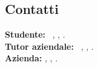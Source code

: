 
\subsection{Contatti}
	\textbf{Studente:} \nomeStudente\ \cognomeStudente, \href{mailto:\emailStudente}{\emailStudente}, \telStudente. \\
	\newline
	\textbf{Tutor aziendale:} \nomeTutorAziendale\ \cognomeTutorAziendale, \href{mailto:\emailTutorAziendale}{\emailTutorAziendale}, \telTutorAziendale. \\
	\newline
	\textbf{Azienda:} \ragioneSocAzienda, \indirizzoAzienda, \href{\sitoAzienda}{\sitoAzienda}.
